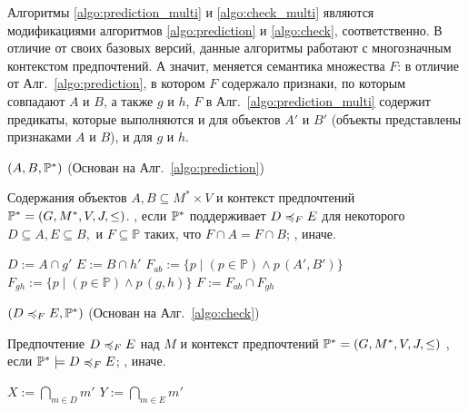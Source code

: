 Алгоритмы \ref{algo:prediction_multi} и \ref{algo:check_multi} являются модификациями алгоритмов \ref{algo:prediction} и \ref{algo:check}, соответственно. В отличие от своих базовых версий, данные алгоритмы работают с многозначным контекстом предпочтений. А значит, меняется семантика множества $F$: в отличие от Алг.~\ref{algo:prediction}, в котором $F$ содержало признаки, по которым совпадают $A$ и $B$, а также $g$ и $h$, $F$ в Алг.~\ref{algo:prediction_multi} содержит предикаты, которые выполняются и для объектов $A'$ и $B'$ (объекты представлены признаками $A$ и $B$), и для $g$ и $h$.

\begin{algorithm}
	\caption{$(A, B, \mathbb{P}^*)$ (Основан на Алг.~\ref{algo:prediction})}
	\label{algo:prediction_multi}
	\begin{algorithmic}[1]
		\REQUIRE Содержания объектов $A, B \subseteq M^* \times V$ и контекст предпочтений $\mathbb{P}^* = (G, M^*, V, J, \leq)$.
		\ENSURE \TRUE, если $\mathbb{P}^*$ поддерживает $D \preccurlyeq_{F} E$ для некоторого $D \subseteq A, E \subseteq B,$ и $F \subseteq \mathbb{P}$ таких, что $F \cap A = F \cap B$; \FALSE, иначе.
		\item[]
		\STATE $D := A \cap g'$
		\STATE $E := B \cap h'$
		\STATE $F_{ab} := \{p\;|\;(p \in \mathbb{P}) \wedge p\,(A', B')\}$
		\STATE $F_{gh} := \{p\;|\;(p \in \mathbb{P}) \wedge p\,(g, h)\}$
		\STATE $F := F_{ab} \cap F_{gh}$
		\IF{$\PP \models \DEF$}
		\RETURN \TRUE
		\ENDIF
		\ENDFOR
		\ENDFOR
		\RETURN \FALSE
	\end{algorithmic}
\end{algorithm}

\begin{algorithm}
	\caption{$(D \preccurlyeq_{F} E, \mathbb{P}^*)$ (Основан на Алг.~\ref{algo:check})}
	\label{algo:check_multi}
	\begin{algorithmic}[1]
		\REQUIRE Предпочтение $D \preccurlyeq_{F} E$ над $M$ и контекст предпочтений $\mathbb{P}^* = (G, M^*, V, J, \leq)$
		\ENSURE \TRUE, если $\mathbb{P}^* \models D \preccurlyeq_{F} E$; \FALSE, иначе.
		\item[]
		\STATE $X := \bigcap_{m \in D}m'$
		\STATE $Y := \bigcap_{m \in E}m'$
		\RETURN \FALSE
		\ENDIF
		\ENDFOR
		\ENDFOR
		\RETURN \TRUE
	\end{algorithmic}
\end{algorithm}

